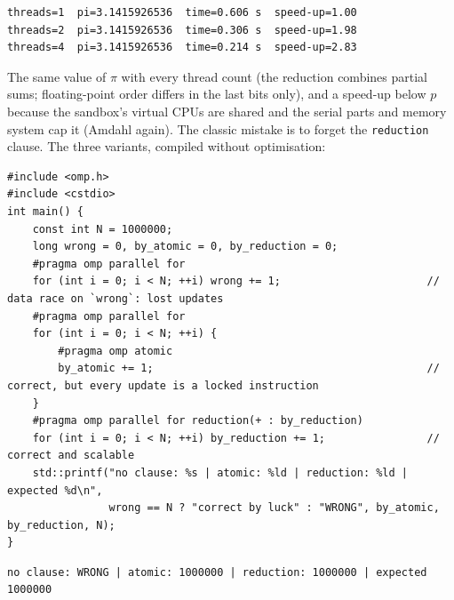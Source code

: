 \documentclass[10pt,a4paper,openany,oneside]{report}
\begin{document}
\begin{lstlisting}[style=out,basicstyle=\ttfamily\scriptsize,title={Captured output}]
threads=1  pi=3.1415926536  time=0.606 s  speed-up=1.00
threads=2  pi=3.1415926536  time=0.306 s  speed-up=1.98
threads=4  pi=3.1415926536  time=0.214 s  speed-up=2.83
\end{lstlisting}
The same value of $\pi$ with every thread count (the reduction combines partial sums; floating-point order differs in the last bits only), and a speed-up below $p$ because the sandbox's virtual CPUs are shared and the serial parts and memory system cap it (Amdahl again). The classic mistake is to forget the \texttt{reduction} clause. The three variants, compiled without optimisation:
\begin{lstlisting}[language={[11]C++},basicstyle=\ttfamily\scriptsize]
#include <omp.h>
#include <cstdio>
int main() {
    const int N = 1000000;
    long wrong = 0, by_atomic = 0, by_reduction = 0;
    #pragma omp parallel for
    for (int i = 0; i < N; ++i) wrong += 1;                       // data race on `wrong`: lost updates
    #pragma omp parallel for
    for (int i = 0; i < N; ++i) {
        #pragma omp atomic
        by_atomic += 1;                                           // correct, but every update is a locked instruction
    }
    #pragma omp parallel for reduction(+ : by_reduction)
    for (int i = 0; i < N; ++i) by_reduction += 1;                // correct and scalable
    std::printf("no clause: %s | atomic: %ld | reduction: %ld | expected %d\n",
                wrong == N ? "correct by luck" : "WRONG", by_atomic, by_reduction, N);
}
\end{lstlisting}
\begin{lstlisting}[style=out,basicstyle=\ttfamily\scriptsize,title={Captured output}]
no clause: WRONG | atomic: 1000000 | reduction: 1000000 | expected 1000000
\end{lstlisting}
\end{document}
